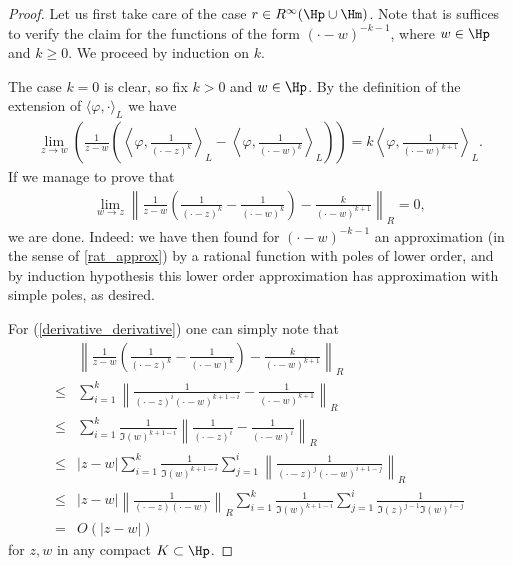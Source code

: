 \begin{proof}
	Let us first take care of the case $r \in R^{\infty}(\Hp \cup \Hm)$. Note that is suffices to verify the claim for the functions of the form $(\cdot - w)^{-k - 1}$, where $w \in \Hp$ and $k \geq 0$. We proceed by induction on $k$.

	The case $k = 0$ is clear, so fix $k > 0$ and $w \in \Hp$. By the definition of the extension of $\langle \varphi, \cdot\rangle_{L}$ we have
	\begin{align*}
		\lim_{z \to w}\left(\frac{1}{z - w} \left(\left\langle \varphi, \frac{1}{(\cdot - z)^{k}}\right\rangle_{L} - \left\langle \varphi, \frac{1}{(\cdot - w)^{k}}\right\rangle_{L}\right)\right) = k \left\langle \varphi, \frac{1}{(\cdot - w)^{k + 1}}\right\rangle_{L}.
	\end{align*}
	If we manage to prove that
	\begin{align}\label{derivative_derivative}
		\lim_{w \to z} \left\| \frac{1}{z - w}\left(\frac{1}{(\cdot - z)^{k}} - \frac{1}{(\cdot - w)^{k}}\right) - \frac{k}{(\cdot - w)^{k + 1}}\right\|_{R} = 0,
	\end{align}
	we are done. Indeed: we have then found for $(\cdot - w)^{-k - 1}$ an approximation (in the sense of \ref{rat_approx}) by a rational function with poles of lower order, and by induction hypothesis this lower order approximation has approximation with simple poles, as desired.

	For (\ref{derivative_derivative}) one can simply note that
	\begin{align*}
		& \left\| \frac{1}{z - w}\left(\frac{1}{(\cdot - z)^{k}} - \frac{1}{(\cdot - w)^{k}}\right) - \frac{k}{(\cdot - w)^{k + 1}}\right\|_{R} \\
		\leq & \sum_{i = 1}^{k} \left\|\frac{1}{(\cdot - z)^{i} (\cdot - w)^{k + 1 - i}} - \frac{1}{(\cdot - w)^{k + 1}}\right\|_{R} \\
		\leq & \sum_{i = 1}^{k} \frac{1}{\Im(w)^{k + 1 - i}}\left\|\frac{1}{(\cdot - z)^{i}} - \frac{1}{(\cdot - w)^{i}}\right\|_{R} \\
		\leq & |z - w|\sum_{i = 1}^{k} \frac{1}{\Im(w)^{k + 1 - i}} \sum_{j = 1}^{i} \left\|\frac{1}{(\cdot - z)^{j} (\cdot - w)^{i + 1 - j}}\right\|_{R} \\
		\leq & |z - w| \left\|\frac{1}{(\cdot - z)(\cdot - w)}\right\|_{R}\sum_{i = 1}^{k} \frac{1}{\Im(w)^{k + 1 - i}} \sum_{j = 1}^{i} \frac{1}{\Im(z)^{j - 1} \Im(w)^{i - j}} \\
		= & O(|z - w|)
	\end{align*}
	for $z, w$ in any compact $K \subset \Hp$.


\end{proof}
